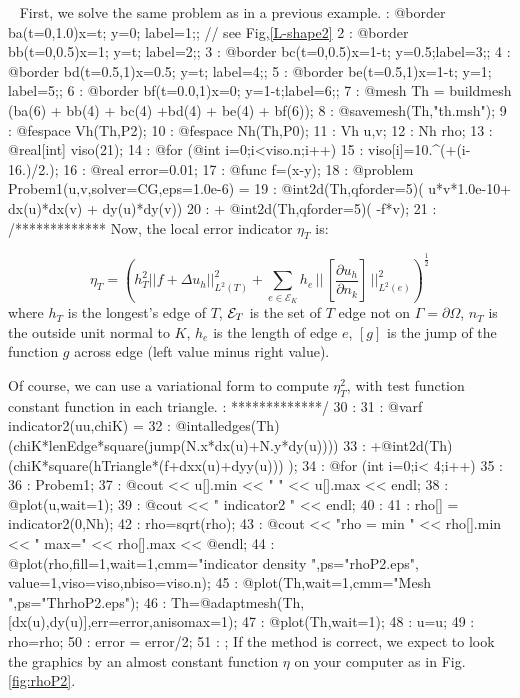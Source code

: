 \documentclass[a4paper,twoside,12pt]{book}
\def\p{\partial}
\begin{document}
\begin{example}~
First, we solve the same problem as in a previous example.
 : @border ba(t=0,1.0){x=t;   y=0;  label=1;}; // see Fig,\ref{L-shape2}
 2 : @border bb(t=0,0.5){x=1;   y=t;  label=2;};
 3 : @border bc(t=0,0.5){x=1-t; y=0.5;label=3;};
 4 : @border bd(t=0.5,1){x=0.5; y=t;  label=4;};
 5 : @border be(t=0.5,1){x=1-t; y=1;  label=5;};
 6 : @border bf(t=0.0,1){x=0;   y=1-t;label=6;};
 7 : @mesh Th = buildmesh (ba(6) + bb(4) + bc(4) +bd(4) + be(4) + bf(6));
 8 : @savemesh(Th,"th.msh");
 9 : @fespace Vh(Th,P2);
10 : @fespace Nh(Th,P0);
11 : Vh u,v;
12 : Nh rho;
13 : @real[int] viso(21);
14 : @for (@int i=0;i<viso.n;i++)
15 :   viso[i]=10.^(+(i-16.)/2.);
16 : @real error=0.01;
17 : @func f=(x-y);
18 : @problem Probem1(u,v,solver=CG,eps=1.0e-6) =
19 :     @int2d(Th,qforder=5)( u*v*1.0e-10+  dx(u)*dx(v) + dy(u)*dy(v))
20 :   + @int2d(Th,qforder=5)( -f*v);
21 : /*************
\eFF
{}%
Now, the local  error indicator $\eta_{T}$ is:
\def\Th{\mathcal{T}_{h}}
\def\AK{\mathcal{E}_{K}}

$$\eta_{T} =\left(  h_{T}^{2} || f + \Delta u_{{h}} ||_{L^{2}(T)}^{2} +\sum_{e\in \AK} h_{e} \,||\, [ \frac{\p u_{h}}{\p n_{k}}] \,||^{2}_{L^{2}(e)} \right)^{\frac{1}{2}}
   $$
where $h_{T}$ is the longest's edge of  $T$, ${\cal E}_T$ is the set of $T$ edge not on
$\Gamma=\p \Omega$, $n_{T}$ is the  outside unit normal to $K$, $h_{e}$ is the length of edge $e$,
$[ g ]$ is the jump of the function $g$ across edge (left value minus right value).

Of course, we can use a variational form to compute $\eta_{T}^{2}$,
with test function constant function in each triangle.
 : *************/
30 :
31 : @varf indicator2(uu,chiK) =
32 :      @intalledges(Th)(chiK*lenEdge*square(jump(N.x*dx(u)+N.y*dy(u))))
33 :     +@int2d(Th)(chiK*square(hTriangle*(f+dxx(u)+dyy(u))) );
34 : @for (int i=0;i< 4;i++)
35 : {
36 :   Probem1;
37 :    @cout << u[].min << " " << u[].max << endl;
38 :    @plot(u,wait=1);
39 :    @cout << " indicator2 " << endl;
40 :
41 :    rho[] = indicator2(0,Nh);
42 :    rho=sqrt(rho);
43 :    @cout << "rho =   min " << rho[].min << " max=" << rho[].max << @endl;
44 :    @plot(rho,fill=1,wait=1,cmm="indicator density ",ps="rhoP2.eps",
                                       value=1,viso=viso,nbiso=viso.n);
45 :    @plot(Th,wait=1,cmm="Mesh ",ps="ThrhoP2.eps");
46 :    Th=@adaptmesh(Th,[dx(u),dy(u)],err=error,anisomax=1);
47 :    @plot(Th,wait=1);
48 :    u=u;
49 :    rho=rho;
50 :   error = error/2;
51 : } ;
\eFF
If the method is correct, we expect to look the graphics by an almost constant function $\eta$ on your computer as in Fig. \ref{fig:rhoP2}.
\begin{figure}[hbt]
\begin{center}


\end{center}
\end{figure}
\end{example}
\end{document}
